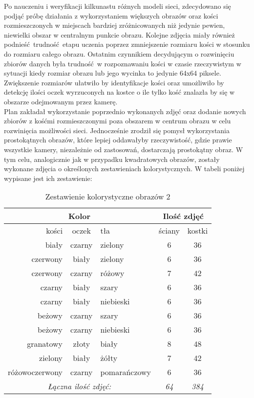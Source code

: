Po nauczeniu i weryfikacji kilkunastu różnych modeli sieci, zdecydowano się podjąć
próbę działania z wykorzystaniem większych obrazów oraz kości rozmieszczonych w miejscach
bardziej zróżnicowanych niż jedynie pewien, niewielki obszar w centralnym punkcie obrazu.
Kolejne zdjęcia miały również podnieść trudność etapu uczenia poprzez zmniejszenie
rozmiaru kości w stosunku do rozmiaru całego obrazu. Ostatnim czynnikiem decydującym o
rozwinięciu zbiorów danych była trudność w rozpoznawaniu kości w czasie rzeczywistym
w sytuacji kiedy rozmiar obrazu lub jego wycinka to jedynie 64x64 piksele. Zwiększenie
rozmiarów ułatwiło by identyfikacje kości oraz umożliwiło by detekcję ilości oczek
wyrzuconych na kostce o ile tylko kość znalazła by się w obszarze odejmowanym przez kamerę. \\
Plan zakładał wykorzystanie poprzednio wykonanych zdjęć oraz dodanie nowych zbiorów
z kośćmi rozmieszczonymi poza obszarem w centrum obrazu w celu rozwinięcia możliwości sieci.
Jednocześnie zrodził się pomysł wykorzystania prostokątnych obrazów, które lepiej oddawałyby
rzeczywistość, gdzie prawie wszystkie kamery, niezależnie od zastosowań, dostarczają
prostokątny obraz. W tym celu, analogicznie jak w przypadku kwadratowych obrazów,
zostały wykonane zdjęcia o określonych zestawieniach kolorystycznych. W tabeli poniżej
wypisane jest ich zestawienie: \\

\begin{table}[ht]
\centering
\begin{tabular}{rcl|cc}
 \multicolumn{3}{c}{Kolor} & \multicolumn{2}{c}{Ilość zdjęć} \\ \hline
kości & oczek & tła & ściany & kostki \\ \hline
biały & czarny & zielony & 6 & 36 \\
czerwony & biały & zielony & 6 & 36 \\
czerwony & czarny & różowy & 7 & 42 \\
czarny & biały & szary & 6 & 36 \\
czarny & biały & niebieski & 6 & 36 \\
beżowy & czarny & szary & 6 & 36 \\
beżowy & czarny & niebieski & 6 & 36 \\
granatowy & złoty & biały & 8 & 48 \\
zielony & biały & żółty & 7 & 42 \\
różowoczerwony & czarny & pomarańczowy & 6 & 36 \\ \hline
\multicolumn{3}{c}{\textit{Łączna ilość zdjęć:}} & \textit{64} & \textit{384}
\end{tabular}
\vspace{0.2cm}
\caption{Zestawienie kolorystyczne obrazów 2}
\label{tab:zestawienie2}
\end{table}

